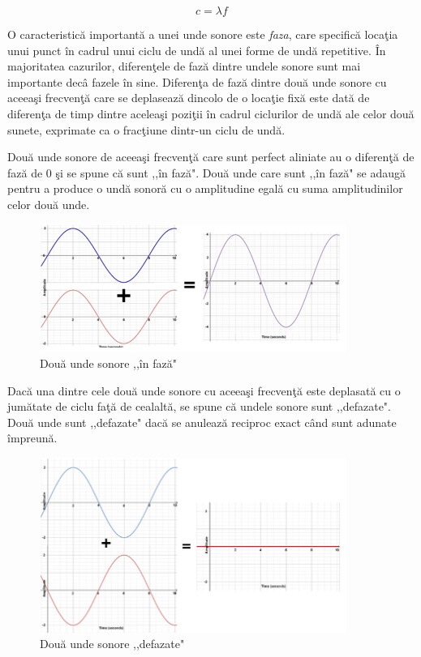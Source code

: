	\begin{equation}
	c=\lambda f
	\end{equation}
	\bigskip
	
	O caracteristic\u{a} important\u{a} a unei unde sonore este {\it{faza}}, care specific\u{a} loca\c{t}ia unui punct \^{i}n cadrul unui ciclu de und\u{a} al unei forme de und\u{a} repetitive. \^{I}n majoritatea cazurilor, diferen\c{t}ele de faz\u{a} dintre undele sonore sunt mai importante dec\^{a} fazele \^{i}n sine. Diferen\c{t}a de faz\u{a} dintre dou\u{a} unde sonore cu aceea\c{s}i frecven\c{t}\u{a} care se deplaseaz\u{a} dincolo de o loca\c{t}ie fix\u{a} este dat\u{a} de diferen\c{t}a de timp dintre acelea\c{s}i pozi\c{t}ii \^{i}n cadrul ciclurilor de und\u{a} ale celor dou\u{a} sunete, exprimate ca o frac\c{t}iune dintr-un ciclu de und\u{a}. 
	\bigskip 
	
	Dou\u{a} unde sonore de aceea\c{s}i frecven\c{t}\u{a} care sunt perfect aliniate au o diferen\c{t}\u{a} de faz\u{a} de 0 \c{s}i se spune c\u{a} sunt ,,\^{i}n faz\u{a}". Dou\u{a} unde care sunt ,,\^{i}n faz\u{a}" se adaug\u{a} pentru a produce o und\u{a} sonor\u{a} cu o amplitudine egal\u{a} cu suma amplitudinilor celor dou\u{a} unde.

	
	\begin{figure}[!htb]
		\centering
		\includegraphics[width=10cm]{imagini/soundWaveGreaterAmplitude.png}
		\caption{Dou\u{a} unde sonore ,,\^{i}n faz\u{a}"}
		\label{Fig7}
	\end{figure}

	Dac\u{a} una dintre cele dou\u{a} unde sonore cu aceea\c{s}i frecven\c{t}\u{a} este deplasat\u{a} cu o jum\u{a}tate de ciclu fa\c{t}\u{a} de cealalt\u{a}, se spune c\u{a} undele sonore sunt ,,defazate". Dou\u{a} unde sunt ,,defazate" dac\u{a} se anuleaz\u{a} reciproc exact c\^{a}nd sunt adunate \^{i}mpreun\u{a}.

	\begin{figure}[!htb]
		\centering
		\includegraphics[width=10cm]{imagini/soundWaveCanceledAmplitude.png}
		\caption{Dou\u{a} unde sonore ,,defazate"}
		\label{Fig8}
	\end{figure}

